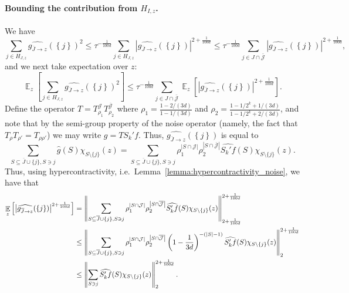\documentclass[10pt]{article}
\newcommand{\card}[1]{\left\lvert #1\right\rvert}
\newcommand{\set}[1]{{\left\{#1\right\}}}
\newcommand{\Expect}[2]{{\mathop{\mathbb E}_{#1}\left[#2\right]}}
\begin{document}
  \paragraph{Bounding the contribution from $H_{I,z}$.}
  We have
  \[
  \sum\limits_{j\in H_{J,z}}\widehat{g_{\overline{J}\rightarrow z}}(\set{j})^2
  \leq \tau^{-\frac{1}{100d}}\sum\limits_{j\in H_{J,z}}\card{\widehat{g_{\overline{J}\rightarrow z}}(\set{j})}^{2+\frac{1}{100d}}
  \leq \tau^{-\frac{1}{100d}}\sum\limits_{j\in J\cap\bar{\mathcal{J}}}\card{\widehat{g_{\overline{J}\rightarrow z}}(\set{j})}^{2+\frac{1}{100d}},
  \]
  and we next take expectation over $z$:
  \begin{equation}\label{eq5}
  \Expect{z}{\sum\limits_{j\in H_{J,z}}\widehat{g_{\overline{J}\rightarrow z}}(\set{j})^2}
  \leq
  \tau^{-\frac{1}{100d}}\sum\limits_{j\in J\cap\bar{\mathcal{J}}}\Expect{z}{\card{\widehat{g_{\overline{J}\rightarrow z}}(\set{j})}^{2+\frac{1}{100d}}}.
  \end{equation}
  Define the operator
  $T = T_{\rho_1}^{\mathcal{J}}T_{\rho_2}^{\overline{\mathcal{J}}}$
  where $\rho_1 = \frac{1-2/(3d)}{1-1/(3d)}$ and $\rho_2 = \frac{1-1/2^k+1/(3d)}{1-1/2^k+2/(3d)}$,
  and note that by the semi-group property of the noise operator (namely, the fact that $T_{\rho}T_{\rho'} = T_{\rho\rho'}$)
  we may write $g = T S_k' f$. Thus, $\widehat{g_{\overline{J}\rightarrow z}}(\set{j})$ is equal to
  \[
  \sum\limits_{S\subseteq \overline{J} \cup\{j\}, S\ni j} \widehat{g}(S)\chi_{S\setminus\{j\}}(z) =
  \sum\limits_{S\subseteq \overline{J} \cup\{j\}, S\ni j}
  \rho_1^{\card{S\cap \mathcal{J}}}
  \rho_2^{\card{S\cap \overline{\mathcal{J}}}}
  \widehat{S_k' f}(S)\chi_{S\setminus\{j\}}(z).
  \]
  Thus, using hypercontractivity, i.e.~Lemma~\ref{lemma:hypercontractivity_noise}, we have that
  \begin{align}\label{eq4}
  \Expect{z}{\card{\widehat{g_{\overline{J}\rightarrow z}}(\set{j})}^{2+\frac{1}{100d}}}
  &=\left\|\sum\limits_{S\subseteq \overline{J} \cup\{j\}, S\ni j}
  \rho_1^{\card{S\cap \mathcal{J}}}
  \rho_2^{\card{S\cap \overline{\mathcal{J}}}}
  \widehat{S_k' f}(S)\chi_{S\setminus\set{j}}(z)\right\|_{2+\frac{1}{100d}}^{2+\frac{1}{100d}}\notag\\
  &\leq \left\|\sum\limits_{S\subseteq \overline{J} \cup\{j\}, S\ni j}
  \rho_1^{\card{S\cap \mathcal{J}}}
  \rho_2^{\card{S\cap \overline{\mathcal{J}}}}
  \left(1-\frac{1}{3d}\right)^{-(\card{S}-1)}\widehat{S_k' f}(S)\chi_{S\setminus\set{j}}(z)\right\|_2^{2+\frac{1}{100d}}\notag\\
  &\leq \left\|\sum\limits_{S\ni j}\widehat{S_k' f}(S)\chi_{S\setminus\set{j}}(z)\right\|_2^{2+\frac{1}{100d}}.
  \end{align}
\end{document}
